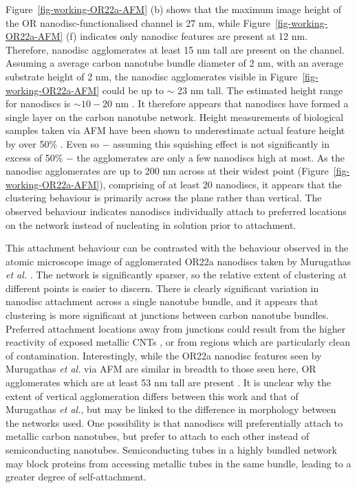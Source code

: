 \documentclass[
  a4paper,
]{scrbook}
\begin{document}
Figure~\ref{fig-working-OR22a-AFM} (b) shows that the maximum image
height of the OR nanodisc-functionalised channel is 27 nm, while
Figure~\ref{fig-working-OR22a-AFM} (f) indicates only nanodisc features
are present at 12 nm. Therefore, nanodisc agglomerates at least 15 nm
tall are present on the channel. Assuming a average carbon nanotube
bundle diameter of 2 nm, with an average substrate height of 2 nm, the
nanodisc agglomerates visible in Figure~\ref{fig-working-OR22a-AFM}
could be up to \(\sim\) 23 nm tall. The estimated height range for
nanodiscs is \(\sim 10 - 20\) nm
\autocite{Nath2007,Bayburt2010,Murugathas2020,Cheema2021}. It therefore
appears that nanodiscs have formed a single layer on the carbon nanotube
network. Height measurements of biological samples taken via AFM have
been shown to underestimate actual feature height by over 50\%
\autocite{Vobornik2023}. Even so \(-\) assuming this squishing effect is
not significantly in excess of 50\% \(-\) the agglomerates are only a
few nanodiscs high at most. As the nanodisc agglomerates are up to 200
nm across at their widest point (Figure~\ref{fig-working-OR22a-AFM}),
comprising of at least 20 nanodiscs, it appears that the clustering
behaviour is primarily across the plane rather than vertical. The
observed behaviour indicates nanodiscs individually attach to preferred
locations on the network instead of nucleating in solution prior to
attachment.

This attachment behaviour can be contrasted with the behaviour observed
in the atomic microscope image of agglomerated OR22a nanodiscs taken by
Murugathas \emph{et al.} \autocite{Murugathas2019a}. The network is
significantly sparser, so the relative extent of clustering at different
points is easier to discern. There is clearly significant variation in
nanodisc attachment across a single nanotube bundle, and it appears that
clustering is more significant at junctions between carbon nanotube
bundles. Preferred attachment locations away from junctions could result
from the higher reactivity of exposed metallic CNTs \autocite{Cao2009},
or from regions which are particularly clean of contamination.
Interestingly, while the OR22a nanodisc features seen by Murugathas
\emph{et al.} via AFM are similar in breadth to those seen here, OR
agglomerates which are at least 53 nm tall are present
\autocite{Murugathas2020}. It is unclear why the extent of vertical
agglomeration differs between this work and that of Murugathas \emph{et
al.}, but may be linked to the difference in morphology between the
networks used. One possibility is that nanodiscs will preferentially
attach to metallic carbon nanotubes, but prefer to attach to each other
instead of semiconducting nanotubes. Semiconducting tubes in a highly
bundled network may block proteins from accessing metallic tubes in the
same bundle, leading to a greater degree of self-attachment.
\end{document}
